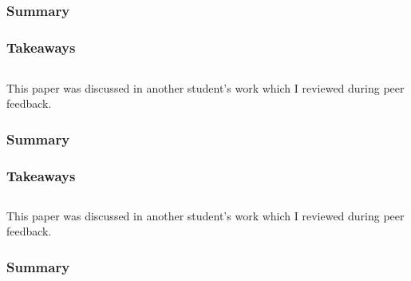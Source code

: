 \documentclass[
	letterpaper, %
]{jdf}
\begin{document}
\subsection{}


\subsubsection{Summary}


\subsubsection{Takeaways}

\subsection{}
This paper was discussed in another student's work which I reviewed during peer feedback.

\subsubsection{Summary}


\subsubsection{Takeaways}

\subsection{}
This paper was discussed in another student's work which I reviewed during peer feedback.

\subsubsection{Summary}
\end{document}
